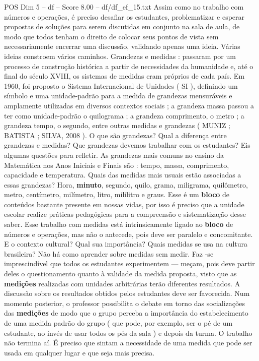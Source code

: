 \begin{textsample}{POS Dim 5 – df – Score 8.00 – df/df\_ef\_15.txt}
Assim como no trabalho com números e operações, é preciso desafiar os estudantes, problematizar e esperar propostas de soluções para serem discutidas em conjunto na sala de aula, de modo que todos tenham o direito de colocar seus pontos de vista sem necessariamente encerrar uma discussão, validando apenas uma ideia.
Várias ideias constroem vários caminhos.
Grandezas e medidas : passaram por um processo de construção histórica a partir de necessidades da humanidade e, até o final do século XVIII, os sistemas de medidas eram próprios de cada país.
Em 1960, foi proposto o Sistema Internacional de Unidades ( SI ), definindo um símbolo e uma unidade-padrão para a medida de grandezas mensuráveis e amplamente utilizadas em diversos contextos sociais ; a grandeza massa passou a ter como unidade-padrão o quilograma ; a grandeza comprimento, o metro ; a grandeza tempo, o segundo, entre outras medidas e grandezas ( MUNIZ ; BATISTA ; SILVA, 2008 ).
O que são grandezas?
Qual a diferença entre grandezas e medidas?
Que grandezas devemos trabalhar com os estudantes?
Eis algumas questões para refletir.
As grandezas mais comuns no ensino da Matemática nos Anos Iniciais e Finais são : tempo, massa, comprimento, capacidade e temperatura.
Quais das medidas mais usuais estão associadas a essas grandezas?
Hora, \textbf{minuto}, segundo, quilo, grama, miligrama, quilômetro, metro, centímetro, milímetro, litro, mililitro e graus.
Esse é um \textbf{bloco} de conteúdos bastante presente em nossas vidas, por isso é preciso que a unidade escolar realize práticas pedagógicas para a compreensão e sistematização desse saber.
Esse trabalho com medidas está intrinsicamente ligado ao \textbf{bloco} de números e operações, mas não o antecede, pois deve ser paralelo e concomitante.
E o contexto cultural?
Qual sua importância?
Quais medidas se usa na cultura brasileira?
Não há como aprender sobre medidas sem medir.
Faz -se imprescindível que todos os estudantes experimentem — meçam, pois deve partir deles o questionamento quanto à validade da medida proposta, visto que as \textbf{medições} realizadas com unidades arbitrárias terão diferentes resultados.
A discussão sobre os resultados obtidos pelos estudantes deve ser favorecida.
Num momento posterior, o professor possibilita o debate em torno das socializações das \textbf{medições} de modo que o grupo perceba a importância do estabelecimento de uma medida padrão do grupo ( que pode, por exemplo, ser o pé de um estudante, ao invés de usar todos os pés da sala ) e depois da turma.
O trabalho não termina aí.
É preciso que sintam a necessidade de uma medida que pode ser usada em qualquer lugar e que seja mais precisa.

\end{textsample}
